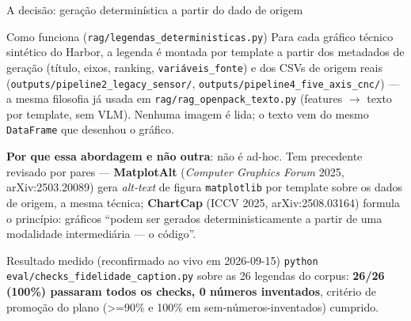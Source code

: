 \documentclass{beamer}
\newenvironment{numerobloco}[1]{\begin{block}{#1}}{\end{block}}
\newenvironment{decisaobloco}[1]{\begin{alertblock}{#1}}{\end{alertblock}}
\begin{document}
\begin{frame}{A decisão: geração determinística a partir do dado de origem}
  \small
  \begin{numerobloco}{Como funciona (\texttt{rag/legendas\_deterministicas.py})}
    Para cada gráfico técnico sintético do Harbor, a legenda é montada por template a partir
    dos metadados de geração (título, eixos, ranking, \texttt{variáveis\_fonte}) e dos CSVs de
    origem reais (\texttt{outputs/pipeline2\_legacy\_sensor/},
    \texttt{outputs/pipeline4\_five\_axis\_cnc/}) — a mesma filosofia já usada em
    \texttt{rag/rag\_openpack\_texto.py} (features $\to$ texto por template, sem VLM).
    Nenhuma imagem é lida; o texto vem do mesmo \texttt{DataFrame} que desenhou o gráfico.
  \end{numerobloco}

  \pause
  \textbf{Por que essa abordagem e não outra}: não é ad-hoc. Tem precedente revisado por
  pares — \textbf{MatplotAlt} (\emph{Computer Graphics Forum} 2025, arXiv:2503.20089) gera
  \emph{alt-text} de figura \texttt{matplotlib} por template sobre os dados de origem, a
  mesma técnica; \textbf{ChartCap} (ICCV 2025, arXiv:2508.03164) formula o princípio: gráficos
  ``podem ser gerados deterministicamente a partir de uma modalidade intermediária — o
  código''.

  \pause
  \begin{decisaobloco}{Resultado medido (reconfirmado ao vivo em 2026-09-15)}
    \texttt{python eval/checks\_fidelidade\_caption.py} sobre as 26 legendas do corpus:
    \textbf{26/26 (100\%) passaram todos os checks, 0 números inventados}, critério de
    promoção do plano (\textgreater=90\% e 100\% em sem-números-inventados) cumprido.
  \end{decisaobloco}
\end{frame}
\end{document}
